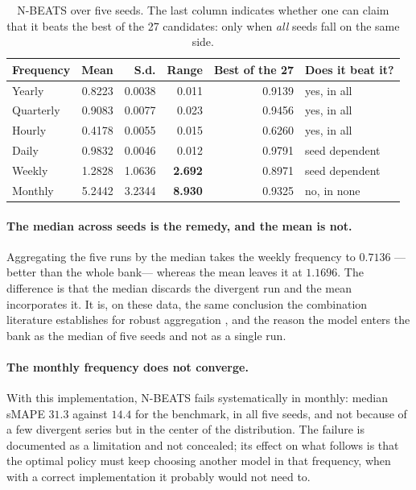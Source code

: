 \begin{table}[htbp]
\centering
\caption{N-BEATS over five seeds. The last column indicates whether one can claim that it
beats the best of the 27 candidates: only when \emph{all} seeds fall on the same side.}
\label{tab:nbeats}
\begin{tabular}{lrrrrl}
\toprule
\textbf{Frequency} & \textbf{Mean} & \textbf{S.d.} & \textbf{Range} &
\textbf{Best of the 27} & \textbf{Does it beat it?} \\
\midrule
Yearly    & 0.8223 & 0.0038 & 0.011 & 0.9139 & yes, in all \\
Quarterly & 0.9083 & 0.0077 & 0.023 & 0.9456 & yes, in all \\
Hourly    & 0.4178 & 0.0055 & 0.015 & 0.6260 & yes, in all \\
Daily     & 0.9832 & 0.0046 & 0.012 & 0.9791 & seed dependent \\
Weekly    & 1.2828 & 1.0636 & \textbf{2.692} & 0.8971 & seed dependent \\
Monthly   & 5.2442 & 3.2344 & \textbf{8.930} & 0.9325 & no, in none \\
\bottomrule
\end{tabular}
\end{table}

\paragraph{The median across seeds is the remedy, and the mean is not.} Aggregating the
five runs by the median takes the weekly frequency to $0.7136$ ---better than the whole
bank--- whereas the mean leaves it at $1.1696$. The difference is that the median discards
the divergent run and the mean incorporates it. It is, on these data, the same conclusion
the combination literature establishes for robust aggregation \cite{wang2023}, and the
reason the model enters the bank as the median of five seeds and not as a single run.

\paragraph{The monthly frequency does not converge.} With this implementation, N-BEATS
fails systematically in monthly: median sMAPE $31.3$ against $14.4$ for the benchmark, in
all five seeds, and not because of a few divergent series but in the center of the
distribution. The failure is documented as a limitation and not concealed; its effect on
what follows is that the optimal policy must keep choosing another model in that
frequency, when with a correct implementation it probably would not need to.

